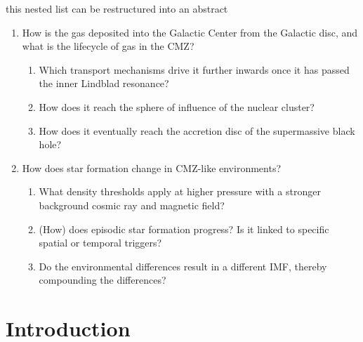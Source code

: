 \documentclass[modern]{aastex62}
\def\agnote#1{{\color{red}#1}}
\begin{document}
\agnote{this nested list can be restructured into an abstract}
\begin{enumerate}
    \item How is the gas deposited into the Galactic Center from the Galactic
        disc, and what is the lifecycle of gas in the CMZ?
    \begin{enumerate}
        \item Which transport mechanisms drive it further inwards once it has passed the inner Lindblad resonance?
        \item How does it reach the sphere of influence of the nuclear cluster?
        \item How does it eventually reach the accretion disc of the supermassive black hole?
    \end{enumerate}
    \item How does star formation change in CMZ-like environments?
        \begin{enumerate}
            \item What density thresholds apply at higher pressure with a stronger background cosmic ray and magnetic field?
            \item (How) does episodic star formation progress?  Is it linked to specific spatial or temporal triggers?
            \item Do the environmental differences result in a different IMF, thereby compounding the differences?
        \end{enumerate}
\end{enumerate}

\section{Introduction}
\end{document}
